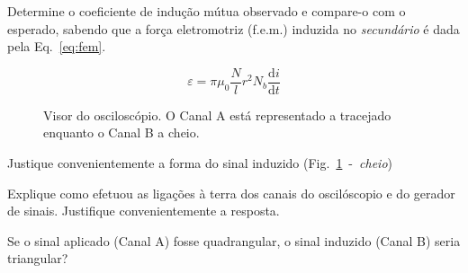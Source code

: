 \begin{parts}
\begin{subparts}
\subpart[30]
Determine o coeficiente de indu\c{c}\~{a}o m\'{u}tua observado e compare-o com o esperado, sabendo que a for\c{c}a eletromotriz (f.e.m.) induzida no \emph{secund\'{a}rio} \'{e} dada pela Eq.~\ref{eq:fem}.

\begin{equation}
\label{eq:fem}
\varepsilon=\pi\mu_0\frac{N}{l}r^2N_b\frac{\mathrm d i}{\mathrm d t}
\end{equation}

\begin{figure}[h]
\begin{center}
\caption{\label{fig:osci}Visor do oscilosc\'{o}pio. O Canal A est\'{a} representado a tracejado enquanto o Canal B a cheio.}
\end{center}
\end{figure}

\subpart[15]
Justique convenientemente a forma do sinal induzido (Fig.~\ref{fig:osci}~-~\textit{cheio})

\subpart[10]
Explique como efetuou as liga\c{c}\~{o}es \`{a} terra dos canais do oscil\'{o}scopio e do gerador de sinais. Justifique convenientemente a resposta.

\subpart[10]
Se o sinal aplicado (Canal A) fosse quadrangular, o sinal induzido (Canal B) seria triangular?

\end{subparts}
\end{parts}